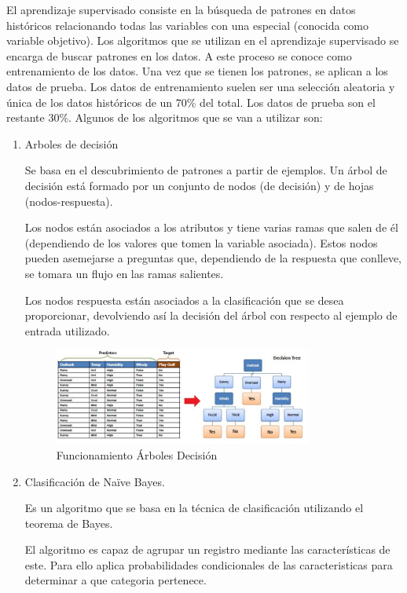 El aprendizaje supervisado consiste en la búsqueda de patrones en datos históricos relacionando todas las variables con una especial (conocida como variable objetivo). Los algoritmos que se utilizan en el aprendizaje supervisado se encarga de buscar patrones en los datos. A este proceso se conoce como entrenamiento de los datos. Una vez que se tienen los patrones, se aplican a los datos de prueba. Los datos de entrenamiento suelen ser una selección aleatoria y única de los datos históricos de un 70\% del total. Los datos de prueba son el restante 30\%. \cite{Manguart2017}
Algunos de los algoritmos que se van a utilizar son:
\begin{enumerate}
\item Arboles de decisión

Se basa en el descubrimiento de patrones a partir de ejemplos. Un árbol de decisión está formado por un conjunto de nodos (de decisión) y de hojas (nodos-respuesta).

Los nodos están asociados a los atributos y tiene varias ramas que salen de él (dependiendo de los valores que tomen la variable asociada). Estos nodos pueden asemejarse a preguntas que, dependiendo de la respuesta que conlleve, se tomara un flujo en las ramas salientes.

Los nodos respuesta están asociados a la clasificación que se desea proporcionar, devolviendo así la decisión del árbol con respecto al ejemplo de entrada utilizado.

\begin{figure}[htb]
\centering
 \includegraphics[width=0.8\textwidth]{recursos/arbol_decision_img1}
\caption{Funcionamiento Árboles Decisión}
\label{fig:fun_arb_dec}
\end{figure}
\FloatBarrier


\item Clasificación de Naïve Bayes.

Es un algoritmo que se basa en la técnica de clasificación utilizando el teorema de Bayes.

El algoritmo es capaz de agrupar un registro mediante las características de este. Para ello aplica probabilidades condicionales de las caracteristicas para determinar a que categoria pertenece. 


\end{enumerate}
